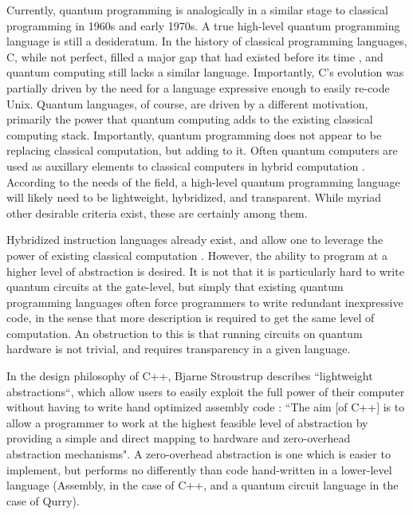 \documentclass[a4paper,twocolumn,11pt,accepted=2017-05-09]{quantumarticle}
\begin{document}
Currently, quantum programming is analogically in a similar stage to classical programming in 1960s and early 1970s. 
A true high-level quantum programming language is still a desideratum.
In the history of classical programming languages, C, while not perfect, filled a major gap that had existed before its time \cite{kernighan2006c}, and quantum computing still lacks a similar language.
Importantly, C's evolution was partially driven by the need for a language expressive enough to easily re-code Unix.
Quantum languages, of course, are driven by a different motivation, primarily the power that quantum computing adds to the existing classical computing stack.
Importantly, quantum programming does not appear to be replacing classical computation, but adding to it.
Often quantum computers are used as auxillary elements to classical computers in hybrid computation \cite{zeng2017first}.
According to the needs of the field, a high-level quantum programming language will likely need to be lightweight, hybridized, and transparent. While myriad other desirable criteria exist, these are certainly among them.

Hybridized instruction languages already exist, and allow one to leverage the power of existing classical computation \cite{forest, cirq, qasm, pyquil}.
However, the ability to program at a higher level of abstraction is desired.
It is not that it is particularly hard to write quantum circuits at the gate-level, but simply that existing quantum programming languages often force programmers to write redundant inexpressive code, in the sense that more description is required to get the same level of computation.
An obstruction to this is that running circuits on quantum hardware is not trivial, and requires transparency in a given language.

In the design philosophy of C++, Bjarne Stroustrup describes ``lightweight abstractions“, which allow users to easily exploit the full power of their computer without having to write hand optimized assembly code \cite{stroustrup}:
``The aim [of C++] is to allow a programmer to work at the highest feasible level of abstraction by providing a simple and direct mapping to hardware and zero-overhead abstraction mechanisms". 
A zero-overhead abstraction is one which is easier to implement, but performs no differently than code hand-written in a lower-level language (Assembly, in the case of C++, and a quantum circuit language in the case of Qurry).
\end{document}
